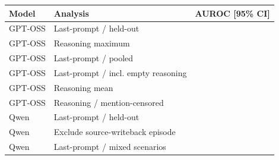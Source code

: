 \begin{tabular}{llc}
\toprule
Model & Analysis & AUROC [95\% CI] \\
\midrule
GPT-OSS & Last-prompt / held-out & \gptossCallProbe{} \gptossCallProbeCI{} \\
GPT-OSS & Reasoning maximum & \gptossCallReasoning{} \gptossCallReasoningCI{} \\
GPT-OSS & Last-prompt / pooled & \gptossRobustPooled{} \gptossRobustPooledCI{} \\
GPT-OSS & Last-prompt / incl. empty reasoning & \gptossRobustAllReplies{} \gptossRobustAllRepliesCI{} \\
GPT-OSS & Reasoning mean & \gptossReasoningMean{} \gptossReasoningMeanCI{} \\
GPT-OSS & Reasoning / mention-censored & \gptossReasoningCensored{} \gptossReasoningCensoredCI{} \\
Qwen & Last-prompt / held-out & \qwenCallProbe{} \qwenCallProbeCI{} \\
Qwen & Exclude source-writeback episode & \qwenNoSourceWriteback{} \qwenNoSourceWritebackCI{} \\
Qwen & Last-prompt / mixed scenarios & \qwenPerCallMixedScenario{} \qwenPerCallMixedScenarioCI{} \\
\bottomrule
\end{tabular}
